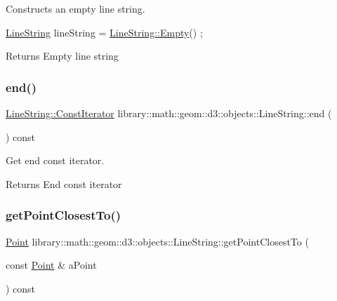 Constructs an empty line string. 


\begin{DoxyCode}
\hyperlink{classlibrary_1_1math_1_1geom_1_1d3_1_1objects_1_1_line_string_aab80e60f34f06d4ab9f84f0e59aa389e}{LineString} lineString = \hyperlink{classlibrary_1_1math_1_1geom_1_1d3_1_1objects_1_1_line_string_ae9e05ddb3ab59060c78d18e19624f307}{LineString::Empty}() ;
\end{DoxyCode}


\begin{DoxyReturn}{Returns}
Empty line string 
\end{DoxyReturn}
\mbox{\label{classlibrary_1_1math_1_1geom_1_1d3_1_1objects_1_1_line_string_a83d9d9ba96fc956a900a7cd2dbf3e82b}} 
\subsubsection{\texorpdfstring{end()}{end()}}
{\footnotesize\ttfamily \hyperlink{classlibrary_1_1math_1_1geom_1_1d3_1_1objects_1_1_line_string_a87db0104282f9fcccdc5b1b99e2301e5}{Line\+String\+::\+Const\+Iterator} library\+::math\+::geom\+::d3\+::objects\+::\+Line\+String\+::end (\begin{DoxyParamCaption}{ }\end{DoxyParamCaption}) const}



Get end const iterator. 

\begin{DoxyReturn}{Returns}
End const iterator 
\end{DoxyReturn}
\mbox{\label{classlibrary_1_1math_1_1geom_1_1d3_1_1objects_1_1_line_string_a39cf8a2be15c3f1686ed855659ded104}} 
\subsubsection{\texorpdfstring{get\+Point\+Closest\+To()}{getPointClosestTo()}}
{\footnotesize\ttfamily \hyperlink{classlibrary_1_1math_1_1geom_1_1d3_1_1objects_1_1_point}{Point} library\+::math\+::geom\+::d3\+::objects\+::\+Line\+String\+::get\+Point\+Closest\+To (\begin{DoxyParamCaption}\item[{const \hyperlink{classlibrary_1_1math_1_1geom_1_1d3_1_1objects_1_1_point}{Point} \&}]{a\+Point }\end{DoxyParamCaption}) const}



